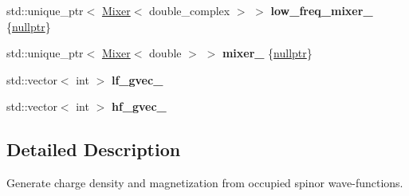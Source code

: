 \begin{DoxyCompactItemize}
\item 
\hypertarget{classsirius_1_1_density_ac3315f3e94017647c28070cec9ff3eab}{}std\+::unique\+\_\+ptr$<$ \hyperlink{classsirius_1_1_mixer}{Mixer}$<$ double\+\_\+complex $>$ $>$ {\bfseries low\+\_\+freq\+\_\+mixer\+\_\+} \{\hyperlink{classsirius_1_1_density_af12e5c3f7ce7767fa506e0bbd169ade3}{nullptr}\}\label{classsirius_1_1_density_ac3315f3e94017647c28070cec9ff3eab}

\item 
\hypertarget{classsirius_1_1_density_ad3d892477f485ee54e50d10f176260a4}{}std\+::unique\+\_\+ptr$<$ \hyperlink{classsirius_1_1_mixer}{Mixer}$<$ double $>$ $>$ {\bfseries mixer\+\_\+} \{\hyperlink{classsirius_1_1_density_af12e5c3f7ce7767fa506e0bbd169ade3}{nullptr}\}\label{classsirius_1_1_density_ad3d892477f485ee54e50d10f176260a4}

\item 
\hypertarget{classsirius_1_1_density_ad8ad5280a2c27d7ad5ce738bb887d96b}{}std\+::vector$<$ int $>$ {\bfseries lf\+\_\+gvec\+\_\+}\label{classsirius_1_1_density_ad8ad5280a2c27d7ad5ce738bb887d96b}

\item 
\hypertarget{classsirius_1_1_density_af08397a050d1912650aeedad758bc444}{}std\+::vector$<$ int $>$ {\bfseries hf\+\_\+gvec\+\_\+}\label{classsirius_1_1_density_af08397a050d1912650aeedad758bc444}

\end{DoxyCompactItemize}


\subsection{Detailed Description}
Generate charge density and magnetization from occupied spinor wave-\/functions. 

